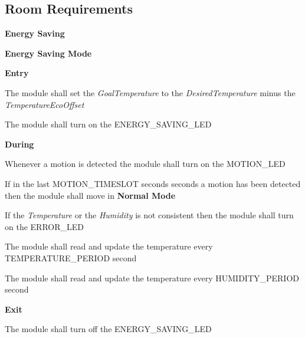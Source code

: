 \subsection{Room Requirements}
		\begin{req_enum}
			\item \textbf{Energy Saving}
				\begin{req_enum}[label*=\arabic*.]
					\item \textbf{Energy Saving Mode}
						\begin{req_enum}[label*=\arabic*.]
							\item \textbf{Entry}
								\begin{req_enum}[label*=\arabic*.]
									\item The module shall set the \textit{GoalTemperature} to the \textit{DesiredTemperature} minus the \textit{TemperatureEcoOffset}
									\item The module shall turn on the ENERGY\_SAVING\_LED
								\end{req_enum}
							\item \textbf{During}
								\begin{req_enum}[label*=\arabic*.]
									\item Whenever a motion is detected the module shall turn on the MOTION\_LED
									\item If in the last MOTION\_TIMESLOT seconds  seconds a motion has been detected then the module shall move in \textbf{Normal Mode}
									\item If the \textit{Temperature} or the \textit{Humidity} is not consistent then the module shall turn on the ERROR\_LED
									\item The module shall read and update the temperature every TEMPERATURE\_PERIOD  second
									\item The module shall read and update the temperature every HUMIDITY\_PERIOD  second
								\end{req_enum}
							\item \textbf{Exit}
								\begin{req_enum}[label*=\arabic*.]
									\item The module shall turn off the ENERGY\_SAVING\_LED
								\end{req_enum}
						\end{req_enum}
	

\end{req_enum}
\end{req_enum}
